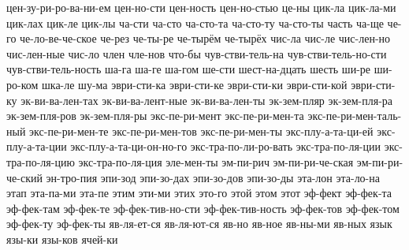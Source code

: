 {цен-зу-ри-ро-ва-ни-ем
цен-но-сти
цен-ность
цен-но-стью
це-ны
цик-ла
цик-ла-ми
цик-лах
цик-ле
цик-лы
ча-сти
ча-сто
ча-сто-та
ча-сто-ту
ча-сто-ты
часть
ча-ще
че-го
че-ло-ве-че-ское
че-рез
че-ты-ре
че-тырём
че-тырёх
чис-ла
чис-ле
чис-лен-но
чис-лен-ные
чис-ло
член
чле-нов
что-бы
чув-стви-тель-на
чув-стви-тель-но-сти
чув-стви-тель-ность
ша-га
ша-ге
ша-гом
ше-сти
шест-на-дцать
шесть
ши-ре
ши-ро-ком
шка-ле
шу-ма
эври-сти-ка
эври-сти-ке
эври-сти-ки
эври-сти-кой
эври-сти-ку
эк-ви-ва-лен-тах
эк-ви-ва-лент-ные
эк-ви-ва-лен-ты
эк-зем-пляр
эк-зем-пля-ра
эк-зем-пля-ров
эк-зем-пля-ры
экс-пе-ри-мент
экс-пе-ри-мен-та
экс-пе-ри-мен-таль-ный
экс-пе-ри-мен-те
экс-пе-ри-мен-тов
экс-пе-ри-мен-ты
экс-плу-а-та-ци-ей
экс-плу-а-та-ции
экс-плу-а-та-ци-он-но-го
экс-тра-по-ли-ро-вать
экс-тра-по-ля-ции
экс-тра-по-ля-цию
экс-тра-по-ля-ция
эле-мен-ты
эм-пи-рич
эм-пи-ри-че-ская
эм-пи-ри-че-ский
эн-тро-пия
эпи-зод
эпи-зо-дах
эпи-зо-дов
эпи-зо-ды
эта-лон
эта-ло-на
этап
эта-па-ми
эта-пе
этим
эти-ми
этих
это-го
этой
этом
этот
эф-фект
эф-фек-та
эф-фек-там
эф-фек-те
эф-фек-тив-но-сти
эф-фек-тив-ность
эф-фек-тов
эф-фек-том
эф-фек-ту
эф-фек-ты
яв-ля-ет-ся
яв-ля-ют-ся
яв-но
яв-ное
яв-ны-ми
яв-ных
язык
язы-ки
язы-ков
ячей-ки
}
